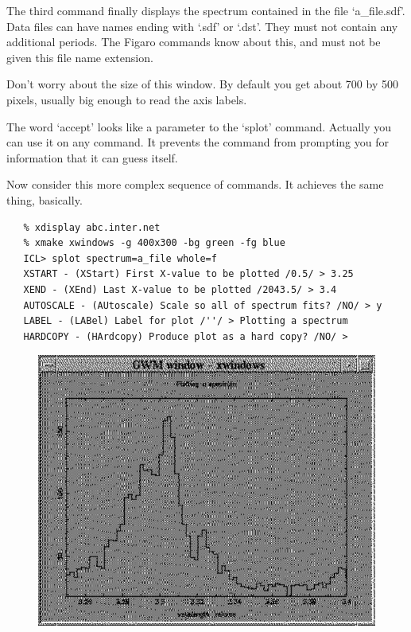 \documentclass[11pt,twoside]{article}
\begin{document}
   The third command finally displays the spectrum contained in the file
   `a\_file.sdf'. Data files can have names ending with `.sdf' or
   `.dst'. They must not contain any additional periods. The Figaro
   commands know about this, and must not be given this file name
   extension.

   Don't worry about the size of this window. By default you get about
   700 by 500 pixels, usually big enough to read the axis labels.

   The word `accept' looks like a parameter to the `splot' command.
   Actually you can use it on any command. It prevents the command from
   prompting you for information that it can guess itself.

   Now consider this more complex sequence of commands. It achieves the
   same thing, basically.

\begin{verbatim}
   % xdisplay abc.inter.net
   % xmake xwindows -g 400x300 -bg green -fg blue
   ICL> splot spectrum=a_file whole=f
   XSTART - (XStart) First X-value to be plotted /0.5/ > 3.25
   XEND - (XEnd) Last X-value to be plotted /2043.5/ > 3.4
   AUTOSCALE - (AUtoscale) Scale so all of spectrum fits? /NO/ > y
   LABEL - (LABel) Label for plot /''/ > Plotting a spectrum
   HARDCOPY - (HArdcopy) Produce plot as a hard copy? /NO/ >
\end{verbatim}

\begin{figure}[htb]
\begin{center}
\includegraphics{sun86_spec2}
\end{center}
\end{figure}
\end{document}
